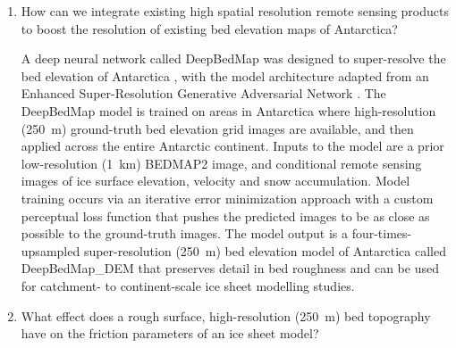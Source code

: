 \begin{enumerate}
  \item How can we integrate existing high spatial resolution remote sensing products to boost the resolution of existing bed elevation maps of Antarctica?

  A deep neural network called DeepBedMap was designed to super-resolve the bed elevation of Antarctica \citep{LeongDeepBedMapdeepneural2020}, with the model architecture adapted from an Enhanced Super-Resolution Generative Adversarial Network \citep{WangESRGANEnhancedSuperResolution2019}.
  The DeepBedMap model is trained on areas in Antarctica where high-resolution (\SI{250}{\metre}) ground-truth bed elevation grid images are available, and then applied across the entire Antarctic continent.
  Inputs to the model are a prior low-resolution (\SI{1}{\kilo\metre}) BEDMAP2 image, and conditional remote sensing images of ice surface elevation, velocity and snow accumulation.
  Model training occurs via an iterative error minimization approach with a custom perceptual loss function that pushes the predicted images to be as close as possible to the ground-truth images.
  The model output is a four-times-upsampled super-resolution (\SI{250}{\metre}) bed elevation model of Antarctica called DeepBedMap\_DEM that preserves detail in bed roughness and can be used for catchment- to continent-scale ice sheet modelling studies.

  \item What effect does a rough surface, high-resolution (\SI{250}{\metre}) bed topography have on the friction parameters of an ice sheet model?


\end{enumerate}
